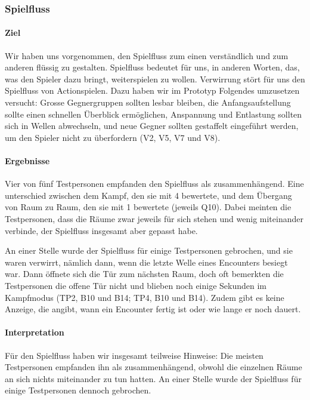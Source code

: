 \documentclass[../Main.tex]{subfiles}
\begin{document}
\subsubsection{Spielfluss}

\paragraph{Ziel}
Wir haben uns vorgenommen, den Spielfluss zum einen verständlich und zum anderen flüssig zu gestalten. Spielfluss bedeutet für uns, in anderen Worten, das, was den Spieler dazu bringt, weiterspielen zu wollen. Verwirrung stört für uns den Spielfluss von Actionspielen. Dazu haben wir im Prototyp Folgendes umzusetzen versucht: Grosse Gegnergruppen sollten lesbar bleiben, die Anfangsaufstellung sollte einen schnellen Überblick ermöglichen, Anspannung und Entlastung sollten sich in Wellen abwechseln, und neue Gegner sollten gestaffelt eingeführt werden, um den Spieler nicht zu überfordern (V2, V5, V7 und V8).

\paragraph{Ergebnisse}
Vier von fünf Testpersonen empfanden den Spielfluss als zusammenhängend. Eine unterschied zwischen dem Kampf, den sie mit 4 bewertete, und dem Übergang von Raum zu Raum, den sie mit 1 bewertete (jeweils Q10). Dabei meinten die Testpersonen, dass die Räume zwar jeweils für sich stehen und wenig miteinander verbinde, der Spielfluss insgesamt aber gepasst habe.

An einer Stelle wurde der Spielfluss für einige Testpersonen gebrochen, und sie waren verwirrt, nämlich dann, wenn die letzte Welle eines Encounters besiegt war. Dann öffnete sich die Tür zum nächsten Raum, doch oft bemerkten die Testpersonen die offene Tür nicht und blieben noch einige Sekunden im Kampfmodus (TP2, B10 und B14; TP4, B10 und B14). Zudem gibt es keine Anzeige, die angibt, wann ein Encounter fertig ist oder wie lange er noch dauert.

\paragraph{Interpretation}
Für den Spielfluss haben wir insgesamt teilweise Hinweise: Die meisten Testpersonen empfanden ihn als zusammenhängend, obwohl die einzelnen Räume an sich nichts miteinander zu tun hatten. An einer Stelle wurde der Spielfluss für einige Testpersonen dennoch gebrochen.
\end{document}
